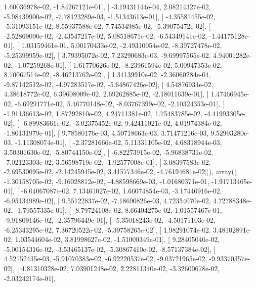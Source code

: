 \documentclass{article}
\begin{document}
          1.60036978e-02,  -1.84267121e-01],
       [ -3.19431144e-04,   2.08214327e-02,  -5.98439900e-02,
         -7.78123289e-03,  -1.51343613e-01],
       [ -4.35581455e-02,  -5.31093151e-02,   8.55937588e-02,
          7.74534985e-02,  -5.39075472e-02],
       [ -2.52869000e-02,  -2.43547217e-02,   5.08518671e-02,
         -6.54349141e-02,  -1.44175128e-01],
       [  1.03159461e-01,   5.00170433e-02,  -2.49310054e-02,
         -8.39727478e-02,  -5.25399959e-02],
       [  3.79395072e-02,   7.23290683e-03,  -9.69997565e-02,
          4.94001282e-02,  -1.07259268e-01],
       [  1.61770626e-02,  -8.23961594e-02,   5.00947353e-02,
          8.70067514e-02,  -8.46213762e-02],
       [  1.34139910e-02,  -2.36060284e-04,  -9.87142512e-02,
         -4.97283517e-02,  -5.64867426e-02],
       [  4.54876934e-02,   4.38618772e-02,   6.39608009e-02,
          2.69262885e-02,  -2.18011639e-01],
       [  1.47466945e-02,  -6.69291771e-02,   5.46770148e-02,
         -8.03767399e-02,  -2.10324353e-01],
       [ -1.91136613e-02,   1.87292810e-02,   4.24711381e-02,
          1.75483785e-02,  -4.41993305e-02],
       [ -6.89983661e-02,  -3.02375452e-02,   9.42411021e-02,
          4.01974384e-02,  -1.80131979e-01],
       [  9.78580176e-03,   4.50718663e-03,   3.71471216e-03,
          9.52993280e-03,  -1.11308074e-01],
       [ -2.37281666e-02,   5.11331105e-02,   4.68318944e-03,
          3.50301630e-02,  -5.80744150e-02],
       [ -6.82273915e-02,  -5.96838731e-02,  -7.02123303e-02,
          3.56598719e-02,  -1.92577008e-01],
       [  3.08397583e-02,  -2.69530095e-02,  -2.14245945e-02,
          3.41577346e-02,  -4.76194681e-02]]), array([[ -1.30158705e-02,  -9.16028812e-02,  -4.88598669e-03,
         -1.01680371e-01,  -1.91713465e-01],
       [ -6.04067087e-02,   7.13461027e-02,   1.66074854e-03,
         -3.17446916e-02,  -6.95134989e-02],
       [  9.55122837e-02,  -7.18690826e-03,   4.72354070e-02,
          4.72788348e-02,  -1.79557335e-01],
       [ -8.79724108e-02,   8.66404275e-02,   1.01557467e-01,
         -9.91809146e-02,  -2.35796449e-01],
       [ -5.35018243e-02,  -4.50171103e-02,  -6.25343295e-02,
          7.36720522e-02,  -5.39758265e-02],
       [  1.98291074e-02,   3.48102891e-02,   1.03544604e-02,
          3.81998627e-02,  -1.51000349e-01],
       [  9.28405040e-02,  -5.00154316e-02,  -3.53465137e-02,
         -5.30867410e-02,  -8.57137384e-02],
       [  4.52152435e-03,  -5.91070383e-02,  -6.92220537e-02,
         -9.03721965e-02,  -9.93370357e-02],
       [  4.81310328e-02,   7.03901248e-02,   2.22811340e-02,
         -3.32600678e-02,  -2.03242174e-01],
\end{document}
